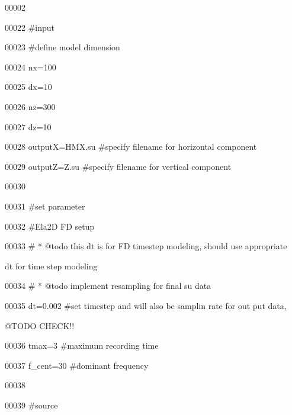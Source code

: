 \documentclass{article}
\begin{document}
\vspace{4pt}
00002 

\vspace{4pt}
00022 \#input

\vspace{4pt}
00023 \#define model dimension

\vspace{4pt}
00024 nx=100

\vspace{4pt}
00025 dx=10

\vspace{4pt}
00026 nz=300

\vspace{4pt}
00027 dz=10

\vspace{4pt}
00028 outputX=HMX.su \#specify filename for horizontal component

\vspace{4pt}
00029 outputZ=Z.su \#specify filename for vertical component

\vspace{4pt}
00030 

\vspace{4pt}
00031 \#set parameter

\vspace{4pt}
00032 \#Ela2D FD setup

\vspace{4pt}
00033 \# * @todo this dt is for FD timestep modeling, should use appropriate 

\vspace{4pt}
dt  for time step modeling

\vspace{4pt}
00034 \# * @todo implement resampling for final su data

\vspace{4pt}
00035 dt=0.002 \#set timestep and will also be samplin rate for out put data, 

\vspace{4pt}
@TODO  CHECK!!

\vspace{4pt}
00036 tmax=3 \#maximum recording time

\vspace{4pt}
00037 f\_cent=30 \#dominant frequency

\vspace{4pt}
00038 

\vspace{4pt}
00039 \#source
\end{document}
